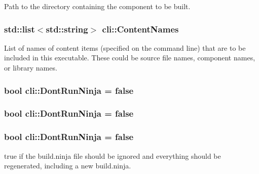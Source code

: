 Path to the directory containing the component to be built. 

\subsubsection[{\texorpdfstring{Content\+Names}{ContentNames}}]{\setlength{\rightskip}{0pt plus 5cm}std\+::list$<$std\+::string$>$ cli\+::\+Content\+Names\hspace{0.3cm}{\ttfamily [static]}}\hypertarget{namespacecli_af6c620daa149b352806b6d052b933ab4}{}\label{namespacecli_af6c620daa149b352806b6d052b933ab4}
List of names of content items (specified on the command line) that are to be included in this executable. These could be source file names, component names, or library names. 
\subsubsection[{\texorpdfstring{Dont\+Run\+Ninja}{DontRunNinja}}]{\setlength{\rightskip}{0pt plus 5cm}bool cli\+::\+Dont\+Run\+Ninja = false\hspace{0.3cm}{\ttfamily [static]}}\hypertarget{namespacecli_a9aa7b41991b7a654aeaad913f5a2c257}{}\label{namespacecli_a9aa7b41991b7a654aeaad913f5a2c257}
\subsubsection[{\texorpdfstring{Dont\+Run\+Ninja}{DontRunNinja}}]{\setlength{\rightskip}{0pt plus 5cm}bool cli\+::\+Dont\+Run\+Ninja = false\hspace{0.3cm}{\ttfamily [static]}}\hypertarget{namespacecli_a9aa7b41991b7a654aeaad913f5a2c257}{}\label{namespacecli_a9aa7b41991b7a654aeaad913f5a2c257}
\subsubsection[{\texorpdfstring{Dont\+Run\+Ninja}{DontRunNinja}}]{\setlength{\rightskip}{0pt plus 5cm}bool cli\+::\+Dont\+Run\+Ninja = false\hspace{0.3cm}{\ttfamily [static]}}\hypertarget{namespacecli_a9aa7b41991b7a654aeaad913f5a2c257}{}\label{namespacecli_a9aa7b41991b7a654aeaad913f5a2c257}
true if the build.\+ninja file should be ignored and everything should be regenerated, including a new build.\+ninja. 
